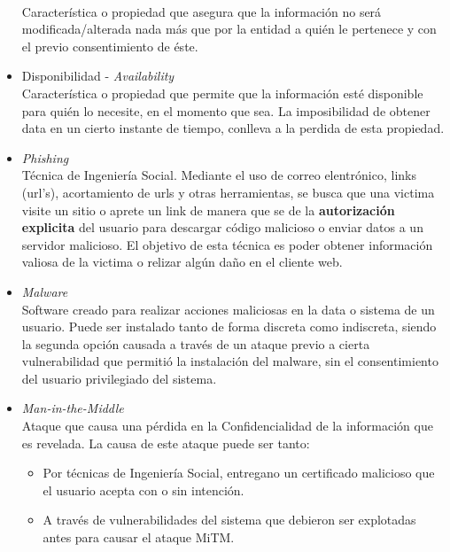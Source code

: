 \begin{itemize}
        \\Característica o propiedad que asegura que la información no será modificada/alterada nada más que por la entidad a quién le pertenece y con el previo consentimiento de éste.
    \item Disponibilidad - \textit{Availability}
        \\Característica o propiedad que permite que la información esté disponible para quién lo necesite, en el momento que sea. La imposibilidad de obtener data en un cierto instante de tiempo, conlleva a la perdida de esta propiedad.
    \item \textit{Phishing}
        \\Técnica de Ingeniería Social. Mediante el uso de correo elentrónico, links (url's), acortamiento de urls y otras herramientas, se busca que una victima visite un sitio o aprete un link de manera que se de la \textbf{autorización explicita} del usuario para descargar código malicioso o enviar datos a un servidor malicioso. El objetivo de esta técnica es poder obtener información valiosa de la victima o relizar algún daño en el cliente web.
    \item \textit{Malware}
        \\Software creado para realizar acciones maliciosas en la data o sistema de un usuario. Puede ser instalado tanto de forma discreta como indiscreta, siendo la segunda opción causada a través de un ataque previo a cierta vulnerabilidad que permitió la instalación del malware, sin el consentimiento del usuario privilegiado del sistema.
    \item \textit{Man-in-the-Middle}
        \\Ataque que causa una pérdida en la Confidencialidad de la información que es revelada. La causa de este ataque puede ser tanto:
            \begin{itemize}
                \item Por técnicas de Ingeniería Social, entregano un certificado malicioso que el usuario acepta con o sin intención.
                \item A través de vulnerabilidades del sistema que debieron ser explotadas antes para causar el ataque MiTM.
            \end{itemize}
\end{itemize}



